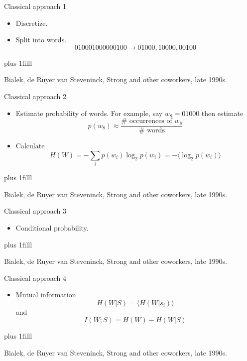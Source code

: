\documentclass{beamer}
\newcommand{\btVFill}{\vskip0pt plus 1filll}
\begin{document}
\begin{frame}{Classical approach 1}
\begin{itemize}
\item Discretize.
\color{reddish}
\begin{center}

\end{center}
\color{black}
\item Split into words.
\color{dark}
$$010001000000100\rightarrow 01000,10000,00100$$
\color{black}
\end{itemize}
\btVFill
\begin{flushright}
\tiny{Bialek, de Ruyer van Steveninck, Strong and other coworkers, late 1990s.}
\end{flushright}
\end{frame}

\begin{frame}{Classical approach 2}
\begin{itemize}
\item Estimate probability of words. For example, say $w_8=01000$ then estimate
\color{dark}
$$p(w_8)\approx\frac{\#\mbox{ occurrences of }w_8}{\#\mbox{ words}}$$ 
\color{black}
\item Calculate
\color{dark}
$$H(W)=-\sum_i p(w_i)\log_2 p(w_i) =-\langle\log_2 p(w_i)\rangle$$ 
\color{black}
\end{itemize}
\btVFill
\begin{flushright}
\tiny{Bialek, de Ruyer van Steveninck, Strong and other coworkers, late 1990s.}
\end{flushright}
\end{frame}


\begin{frame}{Classical approach 3}
\begin{itemize}
\item Conditional probability.
\color{reddish}
\begin{center}

\end{center}
\color{black}
\end{itemize}
\btVFill
\begin{flushright}
\tiny{Bialek, de Ruyer van Steveninck, Strong and other coworkers, late 1990s.}
\end{flushright}
\end{frame}


\begin{frame}{Classical approach 4}
\begin{itemize}
\item Mutual information
\color{dark}
$$H(W|S)=\langle H(W|s_i)\rangle$$
\color{black}
and
\color{dark}
$$I(W;S)=H(W)-H(W|S)$$
\color{black}
\end{itemize}
\btVFill
\begin{flushright}
\color{gray}
  \tiny{Bialek, de Ruyer van Steveninck, Strong and other coworkers, late 1990s.}
\end{flushright}
\color{black}
\end{frame}
\end{document}

